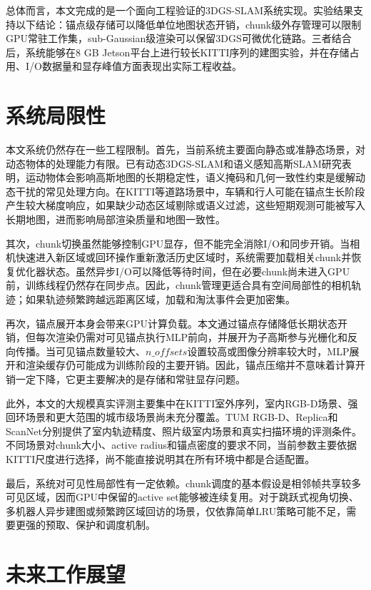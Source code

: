 总体而言，本文完成的是一个面向工程验证的3DGS-SLAM系统实现。实验结果支持以下结论：锚点级存储可以降低单位地图状态开销，chunk级外存管理可以限制GPU常驻工作集，sub-Gaussian级渲染可以保留3DGS可微优化链路。三者结合后，系统能够在8 GB Jetson平台上进行较长KITTI序列的建图实验，并在存储占用、I/O数据量和显存峰值方面表现出实际工程收益。

\section{系统局限性}

本文系统仍然存在一些工程限制。首先，当前系统主要面向静态或准静态场景，对动态物体的处理能力有限。已有动态3DGS-SLAM和语义感知高斯SLAM研究表明，运动物体会影响高斯地图的长期稳定性，语义掩码和几何一致性约束是缓解动态干扰的常见处理方向\cite{zhanglanxin2025dynamicrgbd,zhangbin2025dynamic3dgs,wu2026semantic3dgsslam}。在KITTI等道路场景中，车辆和行人可能在锚点生长阶段产生较大梯度响应，如果缺少动态区域剔除或语义过滤，这些短期观测可能被写入长期地图，进而影响局部渲染质量和地图一致性。

其次，chunk切换虽然能够控制GPU显存，但不能完全消除I/O和同步开销。当相机快速进入新区域或回环操作重新激活历史区域时，系统需要加载相关chunk并恢复优化器状态。虽然异步I/O可以降低等待时间，但在必要chunk尚未进入GPU前，训练线程仍然存在同步点。因此，chunk管理更适合具有空间局部性的相机轨迹；如果轨迹频繁跨越远距离区域，加载和淘汰事件会更加密集。

再次，锚点展开本身会带来GPU计算负载。本文通过锚点存储降低长期状态开销，但每次渲染仍需对可见锚点执行MLP前向，并展开为子高斯参与光栅化和反向传播。当可见锚点数量较大、$n\_offsets$设置较高或图像分辨率较大时，MLP展开和渲染缓存仍可能成为训练阶段的主要开销。因此，锚点压缩并不意味着计算开销一定下降，它更主要解决的是存储和常驻显存问题。

此外，本文的大规模真实评测主要集中在KITTI室外序列\cite{Geiger2012CVPR}，室内RGB-D场景、强回环场景和更大范围的城市级场景尚未充分覆盖。TUM RGB-D、Replica和ScanNet分别提供了室内轨迹精度、照片级室内场景和真实扫描环境的评测条件\cite{sturm2012tum,straub2019replica,dai2017scannet}。不同场景对chunk大小、active radius和锚点密度的要求不同，当前参数主要依据KITTI尺度进行选择，尚不能直接说明其在所有环境中都是合适配置。

最后，系统对可见性局部性有一定依赖。chunk调度的基本假设是相邻帧共享较多可见区域，因而GPU中保留的active set能够被连续复用。对于跳跃式视角切换、多机器人异步建图或频繁跨区域回访的场景，仅依靠简单LRU策略可能不足，需要更强的预取、保护和调度机制。

\section{未来工作展望}

